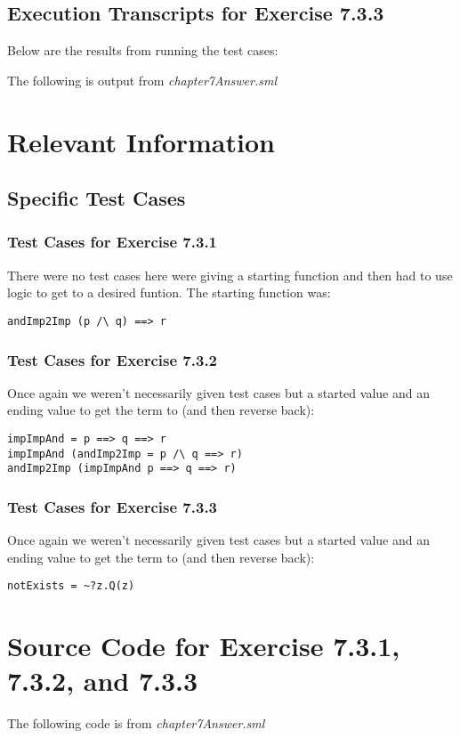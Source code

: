 \documentclass{report}
\begin{document}
\section{Execution Transcripts for Exercise 7.3.3}
\label{sec:exe-ex-7-3-3}
Below are the results from running the test cases:

The following is output from \emph{chapter7Answer.sml}



\chapter{Relevant Information}
\label{cha:relevant-information}

\section{Specific Test Cases}
\label{sec:specific-test-cases}

\subsection{Test Cases for Exercise 7.3.1}
\label{sec:test-cases-ex-7-3-1}
There were no test cases here were giving a starting function and then
had to use logic to get to a desired funtion. The starting function
was:
\begin{lstlisting}[frame=TBlr]
andImp2Imp (p /\ q) ==> r
\end{lstlisting}

\subsection{Test Cases for Exercise 7.3.2}
\label{sec:test-cases-ex-7-3-2}
Once again we weren't necessarily given test cases but a started value
and an ending value to get the term to (and then reverse back):
\begin{lstlisting}[frame=TBlr]
impImpAnd = p ==> q ==> r
impImpAnd (andImp2Imp = p /\ q ==> r)
andImp2Imp (impImpAnd p ==> q ==> r)
\end{lstlisting}

\subsection{Test Cases for Exercise 7.3.3}
\label{sec:test-cases-ex-7-3-3}
Once again we weren't necessarily given test cases but a started value
and an ending value to get the term to (and then reverse back):
\begin{lstlisting}[frame=TBlr]
notExists = ~?z.Q(z)
\end{lstlisting}

\appendix{} 


\chapter{Source Code for  Exercise 7.3.1, 7.3.2, and 7.3.3}
\label{cha:source-code-ex-7-3}

The following code is from \emph{chapter7Answer.sml}

\end{document}
